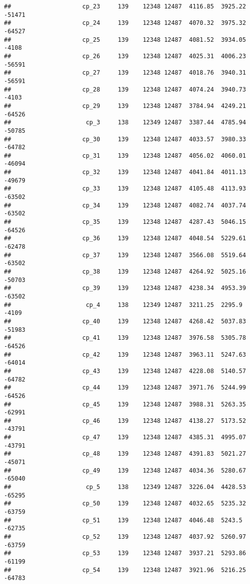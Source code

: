 \documentclass[]{article}
\begin{document}
\begin{verbatim}
##                    cp_23     139    12348 12487  4116.85  3925.22 -51471
##                    cp_24     139    12348 12487  4070.32  3975.32 -64527
##                    cp_25     139    12348 12487  4081.52  3934.05  -4108
##                    cp_26     139    12348 12487  4025.31  4006.23 -56591
##                    cp_27     139    12348 12487  4018.76  3940.31 -56591
##                    cp_28     139    12348 12487  4074.24  3940.73  -4103
##                    cp_29     139    12348 12487  3784.94  4249.21 -64526
##                     cp_3     138    12349 12487  3387.44  4785.94 -50785
##                    cp_30     139    12348 12487  4033.57  3980.33 -64782
##                    cp_31     139    12348 12487  4056.02  4060.01 -46094
##                    cp_32     139    12348 12487  4041.84  4011.13 -49679
##                    cp_33     139    12348 12487  4105.48  4113.93 -63502
##                    cp_34     139    12348 12487  4082.74  4037.74 -63502
##                    cp_35     139    12348 12487  4287.43  5046.15 -64526
##                    cp_36     139    12348 12487  4048.54  5229.61 -62478
##                    cp_37     139    12348 12487  3566.08  5519.64 -63502
##                    cp_38     139    12348 12487  4264.92  5025.16 -50703
##                    cp_39     139    12348 12487  4238.34  4953.39 -63502
##                     cp_4     138    12349 12487  3211.25  2295.9   -4109
##                    cp_40     139    12348 12487  4268.42  5037.83 -51983
##                    cp_41     139    12348 12487  3976.58  5305.78 -64526
##                    cp_42     139    12348 12487  3963.11  5247.63 -64014
##                    cp_43     139    12348 12487  4228.08  5140.57 -64782
##                    cp_44     139    12348 12487  3971.76  5244.99 -64526
##                    cp_45     139    12348 12487  3988.31  5263.35 -62991
##                    cp_46     139    12348 12487  4138.27  5173.52 -43791
##                    cp_47     139    12348 12487  4385.31  4995.07 -43791
##                    cp_48     139    12348 12487  4391.83  5021.27 -45071
##                    cp_49     139    12348 12487  4034.36  5280.67 -65040
##                     cp_5     138    12349 12487  3226.04  4428.53 -65295
##                    cp_50     139    12348 12487  4032.65  5235.32 -63759
##                    cp_51     139    12348 12487  4046.48  5243.5  -62735
##                    cp_52     139    12348 12487  4037.92  5260.97 -63759
##                    cp_53     139    12348 12487  3937.21  5293.86 -61199
##                    cp_54     139    12348 12487  3921.96  5216.25 -64783

\end{verbatim}
\end{document}
